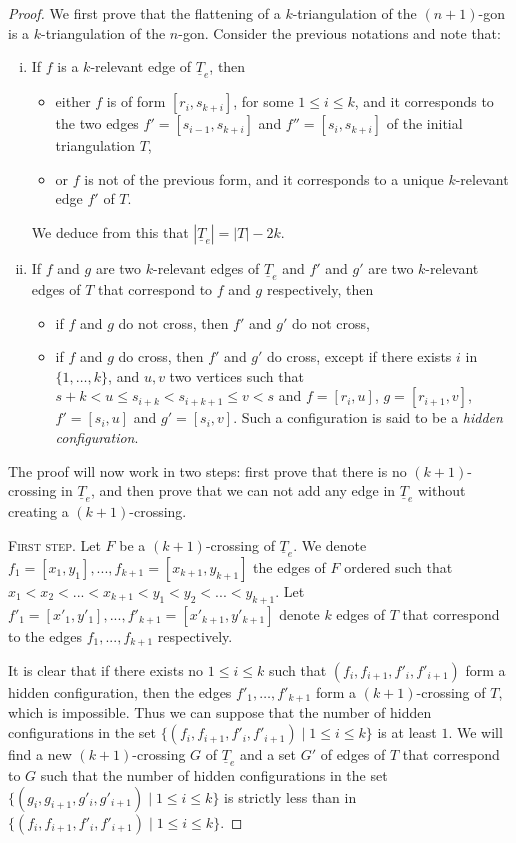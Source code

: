 \documentclass[12pt]{amsart}
\begin{document}
\begin{proof} We first prove that the flattening of a $k$-triangulation of the $(n+1)$-gon is a $k$-triangulation of the $n$-gon. Consider the previous notations and note that:
\begin{enumerate}[(i)]
\item If $f$ is a $k$-relevant edge of $\underline{T}_e$, then
\begin{itemize}
\item either $f$ is of form $[r_i,s_{k+i}]$, for some $1\le i\le k$, and it corresponds to the two edges $f'=[s_{i-1},s_{k+i}]$ and $f''=[s_i,s_{k+i}]$ of the initial triangulation $T$,
\item or $f$ is not of the previous form, and it corresponds to a unique $k$-relevant edge $f'$ of $T$.
\end{itemize}
We deduce from this that $|\underline{T}_e|=|T|-2k$.

\item If $f$ and $g$ are two $k$-relevant edges of $\underline{T}_e$ and $f'$ and $g'$ are two $k$-relevant edges of $T$ that correspond to $f$ and $g$ respectively, then
\begin{itemize}
\item if $f$ and $g$ do not cross, then $f'$ and $g'$ do not cross,
\item if $f$ and $g$ do cross, then $f'$ and $g'$ do cross, except if there exists $i$ in $\{1,\ldots,k\}$, and $u,v$ two vertices such that $s+k<u\le s_{i+k}<s_{i+k+1}\le v<s$ and $f=[r_i,u]$, $g=[r_{i+1},v]$, $f'=[s_i,u]$ and $g'=[s_i,v]$. Such a configuration is said to be a \emph{hidden configuration}.
\end{itemize}

\end{enumerate}

The proof will now work in two steps: first prove that there is no $(k+1)$-crossing in $\underline{T}_e$, and then prove that we can not add any edge in $\underline{T}_e$ without creating a $(k+1)$-crossing.

\medskip
\noindent\textsc{First step.}
Let $F$ be a $(k+1)$-crossing of $\underline{T}_e$. We denote $f_1=[x_1,y_1],...,f_{k+1}=[x_{k+1},y_{k+1}]$ the edges of $F$ ordered such that $x_1<x_2<...<x_{k+1}<y_1<y_2<...<y_{k+1}$. Let $f'_1=[x'_1,y'_1],...,f'_{k+1}=[x'_{k+1},y'_{k+1}]$ denote $k$ edges of $T$ that correspond to the edges $f_1,...,f_{k+1}$ respectively.

It is clear that if there exists no $1\le i\le k$ such that $(f_i,f_{i+1},f'_i,f'_{i+1})$ form a hidden configuration, then the edges $f'_1,\ldots,f'_{k+1}$ form a $(k+1)$-crossing of $T$, which is impossible. Thus we can suppose that the number of hidden configurations in the set $\{(f_i,f_{i+1},f'_i,f'_{i+1})\;|\; 1\le i\le k\}$ is at least $1$. We will find a new $(k+1)$-crossing $G$ of $\underline{T}_e$ and a set $G'$ of edges of $T$ that correspond to $G$ such that the number of hidden configurations in the set $\{(g_i,g_{i+1},g'_i,g'_{i+1})\;|\; 1\le i\le k\}$ is strictly less than in $\{(f_i,f_{i+1},f'_i,f'_{i+1})\;|\; 1\le i\le k\}$.


\end{proof}
\end{document}
